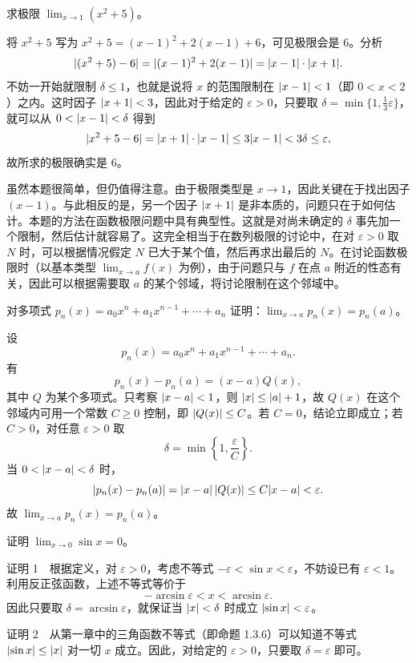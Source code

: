 \begin{xexample}[4.1.2]
求极限 $\lim_{x\to1}(x^2+5)$。
\end{xexample}
\begin{xsolution}
将 $x^2+5$ 写为 $x^2+5=(x-1)^2+2(x-1)+6$，可见极限会是 6。分析
\[
  \lvert(x^2+5)-6\rvert=\lvert(x-1)^2+2(x-1)\rvert=\lvert x-1\rvert\cdot\lvert x+1\rvert.
\]
不妨一开始就限制 $\delta\leq1$，也就是说将 $x$ 的范围限制在 $\lvert x-1\rvert<1$（即 $0<x<2$）之内。这时因子 $\lvert x+1\rvert<3$，因此对于给定的 $\varepsilon>0$，只要取 $\delta=\min\{1,\frac13\varepsilon\}$，就可以从 $0<\lvert x-1\rvert<\delta$ 得到
\[
  \lvert x^2+5-6\rvert=\lvert x+1\rvert\cdot\lvert x-1\rvert\leq3\lvert x-1\rvert<3\delta\leq\varepsilon,
\]
故所求的极限确实是 6。
\end{xsolution}

\begin{xremark}
虽然本题很简单，但仍值得注意。由于极限类型是 $x\to1$，因此关键在于找出因子 $(x-1)$。与此相反的是，另一个因子 $\lvert x+1\rvert$ 是非本质的，问题只在于如何估计。本题的方法在函数极限问题中具有典型性。这就是对尚未确定的 $\delta$ 事先加一个限制，然后估计就容易了。这完全相当于在数列极限的讨论中，在对 $\varepsilon>0$ 取 $N$ 时，可以根据情况假定 $N$ 已大于某个值，然后再求出最后的 $N$。在讨论函数极限时（以基本类型 $\lim_{x\to a}f(x)$ 为例），由于问题只与 $f$ 在点 $a$ 附近的性态有关，因此可以根据需要取 $a$ 的某个邻域，将讨论限制在这个邻域中。
\end{xremark}

\begin{xthought}
对多项式 $p_n(x)=a_0x^n+a_1x^{n-1}+\cdots+a_n$ 证明：$\lim_{x\to a}p_n(x)=p_n(a)$。
\end{xthought}
\begin{xsolution}
设
\[
  p_n(x)=a_0x^n+a_1x^{n-1}+\cdots+a_n.
\]
有
\[
  p_n(x)-p_n(a)=(x-a)Q(x),
\]
其中 $Q$ 为某个多项式。只考察 $\lvert x-a\rvert<1$，则 $\lvert x\rvert\leq\lvert a\rvert+1$，故 $Q(x)$ 在这个邻域内可用一个常数 $C\geq0$ 控制，即 $\lvert Q(x)\rvert\leq C$。若 $C=0$，结论立即成立；若 $C>0$，对任意 $\varepsilon>0$ 取
\[
  \delta=\min\left\{1,\frac\varepsilon C\right\}.
\]
当 $0<\lvert x-a\rvert<\delta$ 时，
\[
  \lvert p_n(x)-p_n(a)\rvert=\lvert x-a\rvert\,\lvert Q(x)\rvert
  \leq C\lvert x-a\rvert<\varepsilon.
\]
故 $\lim_{x\to a}p_n(x)=p_n(a)$。
\end{xsolution}


\begin{xexample}[4.1.3]
证明 $\lim_{x\to0}\sin x=0$。
\end{xexample}
\begin{xproof}
证明 1　根据定义，对 $\varepsilon>0$，考虑不等式 $-\varepsilon<\sin x<\varepsilon$，不妨设已有 $\varepsilon<1$。利用反正弦函数，上述不等式等价于
\[
  -\arcsin\varepsilon<x<\arcsin\varepsilon.
\]
因此只要取 $\delta=\arcsin\varepsilon$，就保证当 $\lvert x\rvert<\delta$ 时成立 $\lvert\sin x\rvert<\varepsilon$。

证明 2　从第一章中的三角函数不等式（即命题 1.3.6）可以知道不等式 $\lvert\sin x\rvert\leq\lvert x\rvert$ 对一切 $x$ 成立。因此，对给定的 $\varepsilon>0$，只要取 $\delta=\varepsilon$ 即可。
\end{xproof}

